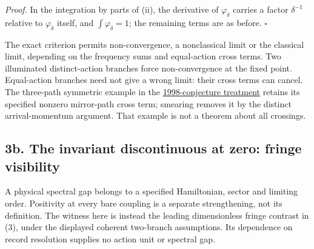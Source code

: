 \documentclass[11pt,a4paper]{article}
\begin{document}
\emph{Proof.} In the integration by parts of (ii), the derivative of
\(\varphi_\delta\) carries a factor \(\delta^{-1}\) relative to
\(\varphi_\delta\) itself, and \(\int\varphi_\delta=1\); the remaining
terms are as before. \(\square\)

The exact criterion permits non-convergence, a nonclassical limit or the
classical limit, depending on the frequency sums and equal-action cross
terms. Two illuminated distinct-action branches force non-convergence at
the fixed point. Equal-action branches need not give a wrong limit:
their cross terms can cancel. The three-path symmetric example in the
\href{rivero-1998-conjecture-central-forces.md}{1998-conjecture
treatment} retains its specified nonzero mirror-path cross term;
smearing removes it by the distinct arrival-momentum argument. That
example is not a theorem about all crossings.

\hypertarget{b.-the-invariant-discontinuous-at-zero-fringe-visibility}{%
\subsection{3b. The invariant discontinuous at zero: fringe
visibility}\label{b.-the-invariant-discontinuous-at-zero-fringe-visibility}}

A physical spectral gap belongs to a specified Hamiltonian, sector and
limiting order. Positivity at every bare coupling is a separate
strengthening, not its definition. The witness here is instead the
leading dimensionless fringe contrast in (3), under the displayed
coherent two-branch assumptions. Its dependence on record resolution
supplies no action unit or spectral gap.
\end{document}
